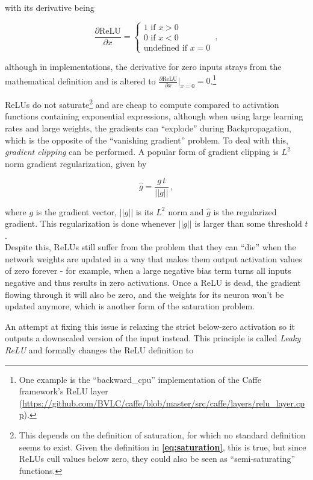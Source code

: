 \noindent with its derivative being 

\[ \frac{\partial \text{ReLU}}{\partial x} = \begin{cases}
							1 \text { if } x > 0\\
							0 \text { if } x < 0\\
							 \text{undefined if } x = 0
						        \end{cases} \,,
\]

\noindent although in implementations, the derivative for zero inputs strays from the mathematical definition and is altered to $\frac{\partial \text{ReLU}}{\partial x}\rvert_{x=0} = 0$.\footnote{One example is the ``backward\_cpu'' implementation of the Caffe framework's ReLU layer (\url{https://github.com/BVLC/caffe/blob/master/src/caffe/layers/relu_layer.cpp}).}

ReLUs do not saturate\footnote{This depends on the definition of saturation, for which no standard definition seems to exist. Given the definition in \textbf{\ref{eq:saturation}}, this is true, but since ReLUs cull values below zero, they could also be seen as ``semi-saturating'' functions.} and are cheap to compute compared to activation functions containing exponential expressions, although when using large learning rates and large weights, the gradients can ``explode'' during Backpropagation, which is the opposite of the ``vanishing gradient'' problem. To deal with this, \textit{gradient clipping} can be performed. A popular form of gradient clipping is $L^2$ norm gradient regularization, given by

\[ \hat{g} = \frac{g\,t}{||g||} \,, \]

\noindent where $g$ is the gradient vector, $||g||$ is its $L^2$ norm and $\hat{g}$ is the regularized gradient. This regularization is done whenever $||g||$ is larger than some threshold $t$. \cite{l2clipping}\\

\noindent Despite this, ReLUs still suffer from the problem that they can ``die'' when the network weights are updated in a way that makes them output activation values of zero forever - for example, when a large negative bias term turns all inputs negative and thus results in zero activations. Once a ReLU is dead, the gradient flowing through it will also be zero, and the weights for its neuron won't be updated anymore, which is another form of the saturation problem.

An attempt at fixing this issue is relaxing the strict below-zero activation so it outputs a downscaled version of the input instead. This principle is called \textit{Leaky ReLU} \cite{lrelu} and formally changes the ReLU definition to 

